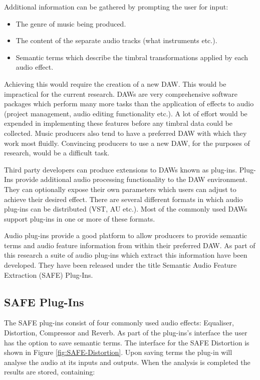 		Additional information can be gathered by prompting the user for input:

		\begin{itemize}
			\item The genre of music being produced.
			\item The content of the separate audio tracks (what instruments etc.).
			\item Semantic terms which describe the timbral transformations applied by each audio
			      effect.
		\end{itemize}

		Achieving this would require the creation of a new DAW. This would be impractical for the current research.
		DAWs are very comprehensive software packages which perform many more tasks than the application of effects
		to audio (project management, audio editing functionality etc.). A lot of effort would be expended in
		implementing these features before any timbral data could be collected.  Music producers also tend to have a
		preferred DAW with which they work most fluidly. Convincing producers to use a new DAW, for the purposes of
		research, would be a difficult task.

		Third party developers can produce extensions to DAWs known as plug-ins. Plug-Ins provide additional audio
		processing functionality to the DAW environment. They can optionally expose their own parameters which users
		can adjust to achieve their desired effect. There are several different formats in which audio plug-ins can
		be distributed (VST, AU etc.). Most of the commonly used DAWs support plug-ins in one or more of these
		formats.

		Audio plug-ins provide a good platform to allow producers to provide semantic terms and audio feature
		information from within their preferred DAW. As part of this research a suite of audio plug-ins which
		extract this information have been developed. They have been released under the title Semantic Audio Feature
		Extraction (SAFE) Plug-Ins.

	\subsection{SAFE Plug-Ins}
	\label{sec:TimbreEvaluation-DAWBasedTimbreEvaluation-SAFE}
		The SAFE plug-ins consist of four commonly used audio effects: Equaliser, Distortion, Compressor and Reverb.
		As part of the plug-ins's interface the user has the option to save semantic terms. The interface for the
		SAFE Distortion is shown in Figure \ref{fig:SAFE-Distortion}. Upon saving terms the plug-in will analyse the
		audio at its inputs and outputs. When the analysis is completed the results are stored, containing:


